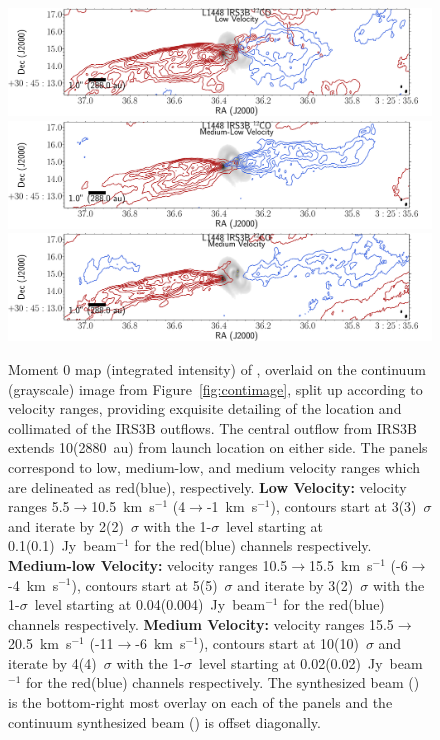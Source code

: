 \begin{figure}[H]
   \begin{center}
   \includegraphics[width=\textwidth]{img/L1448IRS3B_12CO_image_binned_clean__ultralow.pdf}
   \includegraphics[width=\textwidth]{img/L1448IRS3B_12CO_image_binned_clean__low.pdf}
   \includegraphics[width=\textwidth]{img/L1448IRS3B_12CO_image_binned_clean__med.pdf}
   \caption{Moment 0 map (integrated intensity) of \co, overlaid on the continuum (grayscale) image from Figure~\ref{fig:contimage}, split up according to velocity ranges, providing exquisite detailing of the location and collimated of the IRS3B outflows. The central outflow from IRS3B extends 10\arcsec\space(2880~au) from launch location on either side. The panels correspond to low, medium-low, and medium velocity ranges which are delineated as red(blue), respectively. \textbf{Low Velocity:} velocity ranges 5.5$\rightarrow$10.5~km~s$^{-1}$ (4$\rightarrow$-1~km~s$^{-1}$), contours start at 3(3)~$\sigma$ and iterate by 2(2)~$\sigma$ with the 1-$\sigma$~level starting at 0.1(0.1)~Jy~beam$^{-1}$ for the red(blue) channels respectively. \textbf{Medium-low Velocity:} velocity ranges 10.5$\rightarrow$15.5~km~s$^{-1}$ (-6$\rightarrow$-4~km~s$^{-1}$), contours start at 5(5)~$\sigma$ and iterate by 3(2)~$\sigma$ with the 1-$\sigma$~level starting at 0.04(0.004)~Jy~beam$^{-1}$ for the red(blue) channels respectively. \textbf{Medium Velocity:} velocity ranges 15.5$\rightarrow$20.5~km~s$^{-1}$ (-11$\rightarrow$-6~km~s$^{-1}$), contours start at 10(10)~$\sigma$ and iterate by 4(4)~$\sigma$ with the 1-$\sigma$~level starting at 0.02(0.02)~Jy~beam$^{-1}$ for the red(blue) channels respectively. The \co\space synthesized beam (\cobeam) is the bottom-right most overlay on each of the panels and the continuum synthesized beam (\contbeam) is offset diagonally.}\label{fig:comomentmap}
\end{center}
\end{figure}

